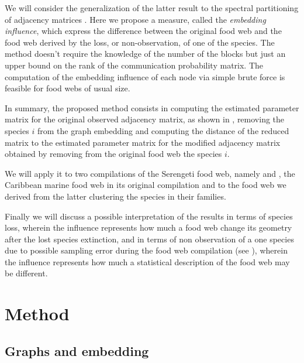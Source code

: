 \documentclass[12pt]{article}
\theoremstyle{definition}
\begin{document}
We will consider the generalization of the latter result to the spectral partitioning of adjacency matrices \cite{sussman2012consistent}. Here we propose a measure, called the {\em embedding influence}, which express the difference between the original food web and the food web derived by the loss, or non-observation, of one of the species. The method doesn't require the knowledge of the number of the blocks but just an upper bound on the rank of the communication probability matrix. The computation of the embedding influence of each node via simple brute force is feasible for food webs of usual size.

In summary, the proposed method consists in computing the estimated parameter matrix for the original observed adjacency matrix, as shown in  \cite{fishkind2013consistent}, removing the species $i$ from the graph embedding and computing the distance of the reduced matrix to the estimated parameter matrix for the modified adjacency matrix obtained by removing from the original food web the species $i$.

 We will apply it to two compilations of the Serengeti food web, namely \cite{baskerville2011spatial} and \cite{de2011serengeti}, the Caribbean marine food web in its original compilation \cite{rezende2009compartments} and to the food web we derived from the latter clustering the species in their families.
 
Finally we will discuss a possible interpretation of the results in terms of species loss, wherein the influence represents how much a food web change its geometry after the lost species extinction, and in terms of non observation of a one species due to possible sampling error during the food web compilation (see \cite[Section 11.2]{rossberg2013food}), wherein the influence represents how much a statistical description of the food web may be different.

\section{Method}
\subsection{Graphs and embedding}\label{secsec:method}
\end{document}
